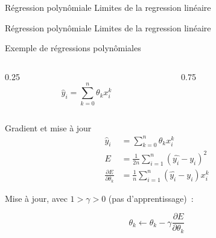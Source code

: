 
\begin{frame}{Régression polynômiale}
  Limites de la regression linéaire
\end{frame}

\begin{frame}{Régression polynômiale}
  Limites de la regression linéaire
\end{frame}

\begin{frame}{Exemple de régressions polynômiales}
  \begin{columns}
    \begin{column}{0.25\tw}
      \[
        \hat{y}_i = \sum_{k = 0}^n \theta_k x_i^k
      \]
    \end{column}
    \begin{column}{0.75\tw}
    \end{column}
  \end{columns}
\end{frame}

\begin{frame}{Gradient et mise à jour}
  \begin{align*}
    \hat{y}_i & = \sum_{k = 0}^n \theta_k x_i^k \\
    E & = \frac{1}{2n} \sum_{i=1}^n (\hat{y_i} - y_i)^2 \\
    \frac{\partial{E}}{\partial{\theta_k}} & = \frac{1}{n} \sum_{i=1}^n (\hat{y_i} - y_i) x_i^k
  \end{align*}

  Mise à jour, avec $1 > \gamma > 0$ (pas d'apprentissage)~:

  \[
    \theta_k \leftarrow \theta_k - \gamma\frac{\partial{E}}{\partial{\theta_k}}
  \]
\end{frame}
